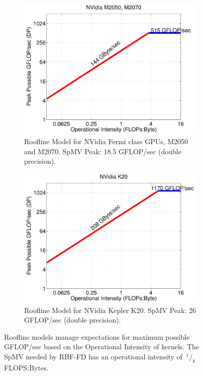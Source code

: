 \documentclass{report}
\begin{document}
\begin{figure} 
\begin{subfigure}{0.45\textwidth}
\centering
\includegraphics[width=\textwidth]{../figures/spmv/roofline_m2050_m2070-eps-converted-to.pdf}
\caption{Roofline Model for NVidia Fermi class GPUs, M2050 and M2070. SpMV Peak: 18.5 GFLOP/sec (double precision).}
\label{fig:roofline_m2070}
\end{subfigure}
\quad
\begin{subfigure}{0.45\textwidth}
\centering
\includegraphics[width=\textwidth]{../figures/spmv/roofline_k20-eps-converted-to.pdf}
\caption{Roofline Model for NVidia Kepler K20. SpMV Peak: 26 GFLOP/sec (double precision).}
\label{fig:roofline_k20}
\end{subfigure}
\caption{Roofline models manage expectations for maximum possible GFLOP/sec based on the Operational Intensity of kernels. The SpMV needed by RBF-FD has an operational intensity of $\ ^{1}/_{8}$ FLOPS:Bytes. }
\end{figure}
\end{document}
